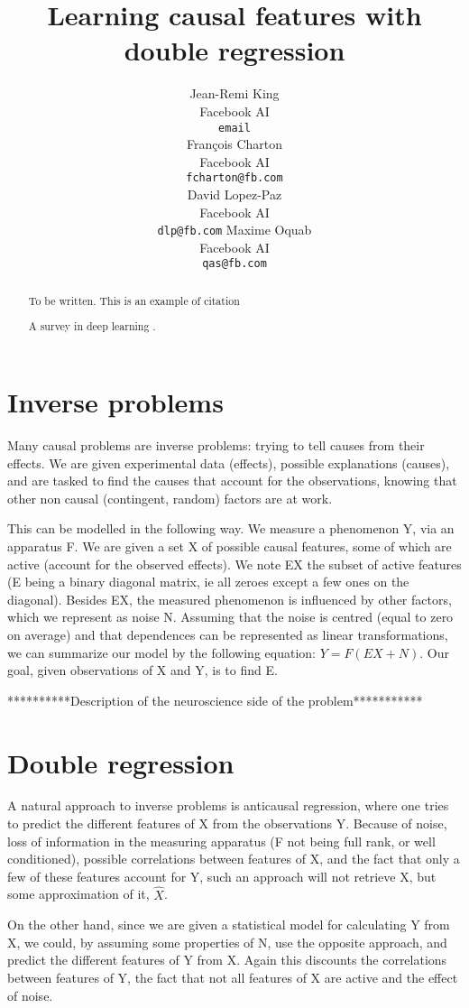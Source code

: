 \documentclass{article}
\title{Learning causal features with double regression}
\author{%
  Jean-Remi King\\
  Facebook AI\\
  \texttt{email} \\
  \And
  Fran\c{c}ois Charton\\
  Facebook AI\\
  \texttt{fcharton@fb.com}\\
  \And
  David Lopez-Paz\\
  Facebook AI\\
  \texttt{dlp@fb.com}
  \And
  Maxime Oquab\\
  Facebook AI\\
  \texttt{qas@fb.com}
}
\begin{document}
\maketitle

\begin{abstract}
    To be written.
This is an example of citation

A survey in deep learning \citep{deep_learning_nature}. 
\end{abstract}

\section{Inverse problems}
Many causal problems are inverse problems: trying to tell causes from their effects. We are given experimental data (effects), possible explanations (causes), and are tasked to find the causes that account for the observations, knowing that other non causal (contingent, random) factors are at work.

This can be modelled in the following way. We measure a phenomenon Y, via an apparatus F. We are given a set X of possible causal features, some of which are active (account for the observed effects). We note EX the subset of active features (E being a binary diagonal matrix, ie all zeroes except a few ones on the diagonal). Besides EX, the measured phenomenon is influenced by other factors, which we represent as noise N. Assuming that the noise is centred (equal to zero on average) and that dependences can be represented as linear transformations, we can summarize our model by the following equation: $Y = F(EX + N)$. Our goal, given observations of X and Y, is to find E.
 
 **********Description of the neuroscience side of the problem***********
 

\section{Double regression}
A natural approach to inverse problems is anticausal regression, where one tries to predict the different features of X from the observations Y. Because of noise, loss of information in the measuring apparatus (F not being full rank, or well conditioned), possible correlations between features of X, and the fact that only a few of these features account for Y, such an approach will not retrieve X, but some approximation of it, $\hat X$. 

On the other hand, since we are given a statistical model for calculating Y from X, we could, by assuming some properties of N, use the opposite approach, and predict the different features of Y from X. Again this discounts the correlations between features of Y, the fact that not all features of X are active and the effect of noise.
\end{document}

